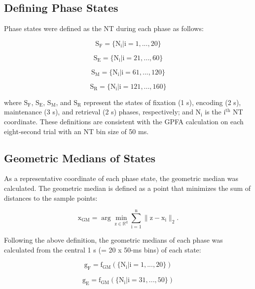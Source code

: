 \documentclass[preprint,review,12pt]{elsarticle}%
\begin{document}
\subsection{Defining Phase States}
Phase states were defined as the NT during each phase as follows:

\begin{equation}
\mathrm{S_F = \{N_{i} | i = 1, ..., 20\}}
\end{equation}

\begin{equation}
\mathrm{S_E = \{N_{i} | i = 21, ..., 60\}}
\end{equation}

\begin{equation}
\mathrm{S_M = \{N_{i} | i = 61, ..., 120\}}
\end{equation}

\begin{equation}
\mathrm{S_R = \{N_{i} | i = 121, ..., 160\}}
\end{equation}

where $\mathrm{S_F}$, $\mathrm{S_E}$, $\mathrm{S_M}$, and $\mathrm{S_R}$ represent the states of fixation (1 s), encoding (2 s), maintenance (3 s), and retrieval (2 s) phases, respectively; and $\mathrm{N_{i}}$ is the $\mathrm{i^{th}}$ NT coordinate. These definitions are consistent with the GPFA calculation on each eight-second trial with an NT bin size of 50 ms.


\subsection{Geometric Medians of States}
As a representative coordinate of each phase state, the geometric median was calculated. The geometric median is defined as a point that minimizes the sum of distances to the sample points:

\begin{equation}
\mathrm{x_{GM} = \arg\min_{z \in \mathbb{R}^d} \sum_{i=1}^n \|z - x_i\|_2}.
\end{equation}

Following the above definition, the geometric medians of each phase was calculated from the central 1 s (= 20 x 50-ms bins) of each state:

\begin{equation}
\mathrm{g_F = f_{GM}(\{N_{i} | i = 1, ..., 20\})}
\end{equation}

\begin{equation}
\mathrm{g_E = f_{GM}(\{N_{i} | i = 31, ..., 50\})}
\end{equation}
\end{document}
